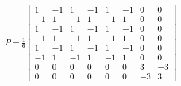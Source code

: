 \documentclass{standalone}
\begin{document}
\begin{varwidth}{\linewidth}
\begin{align*}
P=\frac{1}{6}\left[\begin{array}{cccccccc}
    1 & -1 & 1 & -1 & 1 & -1 & 0 & 0 \\
    -1 & 1 & -1 & 1 & -1 & 1 & 0 & 0 \\
    1 & -1 & 1 & -1 & 1 & -1 & 0 & 0 \\
    -1 & 1 & -1 & 1 & -1 & 1 & 0 & 0 \\
    1 & -1 & 1 & -1 & 1 & -1 & 0 & 0 \\
    -1 & 1 & -1 & 1 & -1 & 1 & 0 & 0 \\
    0 & 0 & 0 & 0 & 0 & 0 & 3 & -3 \\
    0 & 0 & 0 & 0 & 0 & 0 & -3 & 3
\end{array}\right]
\end{align*}
\end{varwidth}
\end{document}
